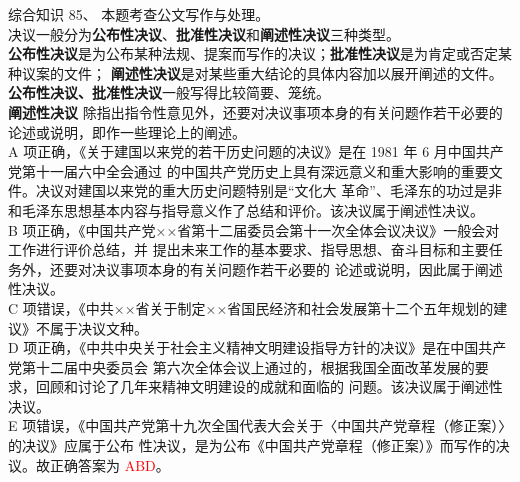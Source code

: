 \documentclass[aspectratio=169]{beamer}
\begin{document}
\begin{frame}[t]{综合知识}
    85、
    本题考查公文写作与处理。\\
    {\scriptsize
    决议一般分为\textbf{公布性决议}、\textbf{批准性决议}和\textbf{阐述性决议}三种类型。\\
    \textbf{公布性决议}是为公布某种法规、提案而写作的决议；\textbf{批准性决议}是为肯定或否定某种议案的文件；
    \textbf{阐述性决议}是对某些重大结论的具体内容加以展开阐述的文件。\\
    \textbf{公布性决议、批准性决议}一般写得比较简要、笼统。\\
    \textbf{阐述性决议} 除指出指令性意见外，还要对决议事项本身的有关问题作若干必要的论述或说明，即作一些理论上的阐述。\\

    A 项正确，《关于建国以来党的若干历史问题的决议》是在 1981 年 6 月中国共产党第十一届六中全会通过
    的中国共产党历史上具有深远意义和重大影响的重要文件。决议对建国以来党的重大历史问题特别是“文化大
    革命”、毛泽东的功过是非和毛泽东思想基本内容与指导意义作了总结和评价。该决议属于阐述性决议。\\

    B 项正确，《中国共产党××省第十二届委员会第十一次全体会议决议》一般会对工作进行评价总结，并
    提出未来工作的基本要求、指导思想、奋斗目标和主要任务外，还要对决议事项本身的有关问题作若干必要的
    论述或说明，因此属于阐述性决议。\\

    C 项错误，《中共××省关于制定××省国民经济和社会发展第十二个五年规划的建议》不属于决议文种。\\

    D 项正确，《中共中央关于社会主义精神文明建设指导方针的决议》是在中国共产党第十二届中央委员会
    第六次全体会议上通过的，根据我国全面改革发展的要求，回顾和讨论了几年来精神文明建设的成就和面临的
    问题。该决议属于阐述性决议。\\

    E 项错误，《中国共产党第十九次全国代表大会关于〈中国共产党章程（修正案）〉的决议》应属于公布
    性决议，是为公布《中国共产党章程（修正案）》而写作的决议。故正确答案为 \textcolor{red}{ABD}。\\



    }
\end{frame}                           
\end{document}
